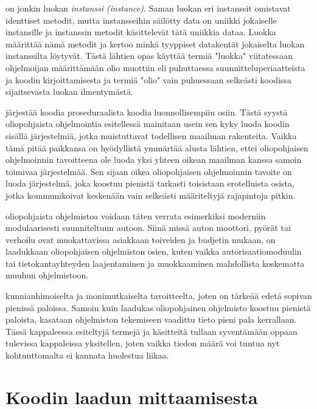 \documentclass[a4paper,justified,notoc]{tufte-book}
\newcommand{\eng}[1]{\textit{(#1)}}
\newcommand{\new}[1]{\textit{\gls{#1}}}
\newcommand{\neweng}[2]{\new{#1} \eng{#2}}
\begin{document}
\begin{fullwidth}
 on jonkin luokan \neweng{instanssi}{instance}. Saman luokan eri
instanssit omistavat identtiset metodit, mutta instansseihin säilötty data on uniikki jokaiselle
instansille ja instanssin metodit käsittelevät tätä uniikkia dataa. Luokka määrittää nämä metodit
ja kertoo minkä tyyppiset datakentät jokaiselta luokan instanssilta löytyvät. Tästä lähtien
opas käyttää termiä "luokka" viitatessaan ohjelmoijan määrittämään olio muottiin eli puhuttaessa
suunnitteluperiaatteista ja koodin kirjoittamisesta ja termiä "olio" vain puhuessaan selkeästi
koodissa sijaitsevasta luokan ilmentymästä.

 järjestää koodia proseduraalista koodia luonnollisempiin osiin.
Tästä syystä oliopohjaista ohjelmointia esitellessä mainitaan usein sen kyky luoda koodin sisällä
järjestelmiä, jotka muistuttavat todellisen maailman rakenteita. Vaikka tämä pitää paikkansa on
hyödyllistä ymmärtää alusta lähtien, ettei oliopohjaisen ohjelmoinnin tavoitteena ole luoda yksi
yhteen oikean maailman kanssa samoin toimivaa järjestelmää. Sen sijaan oikea oliopohjaisen
ohjelmoinnin tavoite on luoda järjestelmä, joka koostuu pienistä tarkasti toisistaan erotelluista
osista, jotka kommunikoivat keskenään vain selkeästi määriteltyjä rajapintoja pitkin.

 oliopohjaista ohjelmistoa voidaan täten verrata esimerkiksi
moderniin modulaarisesti suunniteltuun autoon. Siinä missä auton moottori, pyörät tai verhoilu
ovat muokattavissa asiakkaan toiveiden ja budjetin mukaan, on laadukkaan oliopohjaisen ohjelmiston
osien, kuten vaikka autorisaatiomoduulin tai tietokantayhteyden laajentaminen ja muokkaaminen
mahdollista koskematta muuhun ohjelmistoon.

 kunnianhimoiselta ja monimutkaiselta tavoitteelta, joten on tärkeää
edetä sopivan pienissä paloissa. Samoin kuin laadukas oliopohjainen ohjelmisto koostuu pienistä
paloista, kasataan ohjelmiston tekemiseen vaadittu tieto pieni pala kerrallaan. Tässä kappaleessa
esiteltyjä termejä ja käsitteitä tullaan syventämään oppaan tulevissa kappaleissa yksitellen,
joten vaikka tiedon määrä voi tuntua nyt kohtuuttomalta ei kannata huolestua liikaa.


\section{Koodin laadun mittaamisesta}
\label{koodin laadusta}


\end{fullwidth}
\end{document}
